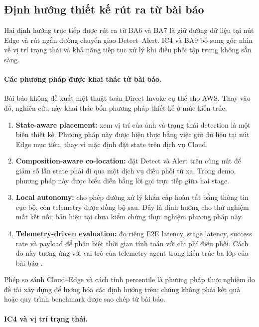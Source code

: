 \subsection{Định hướng thiết kế rút ra từ bài báo}

Hai định hướng trực tiếp được rút ra từ BA6 và BA7 là giữ đường dữ liệu tại nút
Edge và rút ngắn đường chuyển giao Detect--Alert. IC4 và BA9 bổ sung góc nhìn về
vị trí trạng thái và khả năng tiếp tục xử lý khi điều phối tập trung không sẵn
sàng.

\paragraph{Các phương pháp được khai thác từ bài báo.}
Bài báo không đề xuất một thuật toán Direct Invoke cụ thể cho AWS. Thay vào đó,
nghiên cứu này khai thác bốn phương pháp thiết kế ở mức kiến trúc:

\begin{enumerate}
    \item \textbf{State-aware placement:} xem vị trí của ảnh và trạng thái detection
    là một biến thiết kế. Phương pháp này được hiện thực bằng việc giữ dữ liệu tại
    nút Edge mục tiêu, thay vì mặc định đặt state trên dịch vụ Cloud.
    \item \textbf{Composition-aware co-location:} đặt Detect và Alert trên cùng
    nút để giảm số lần state phải đi qua một dịch vụ điều phối từ xa. Trong demo,
    phương pháp này được biểu diễn bằng lời gọi trực tiếp giữa hai stage.
    \item \textbf{Local autonomy:} cho phép đường xử lý khẩn cấp hoàn tất bằng
    thông tin cục bộ, còn telemetry được đồng bộ sau. Đây là định hướng cho thử
    nghiệm mất kết nối; bản hiện tại chưa kiểm chứng thực nghiệm phương pháp này.
    \item \textbf{Telemetry-driven evaluation:} đo riêng E2E latency, stage
    latency, success rate và payload để phân biệt thời gian tính toán với chi phí
    điều phối. Cách đo này tương ứng với vai trò của telemetry agent trong kiến
    trúc ba lớp của bài báo \cite{malazi2026orchestrating}.
\end{enumerate}

Phép so sánh Cloud--Edge và cách tính percentile là phương pháp thực nghiệm do đề
tài xây dựng để lượng hóa các định hướng trên; chúng không phải kết quả hoặc quy
trình benchmark được sao chép từ bài báo.

\paragraph{IC4 và vị trí trạng thái.}

